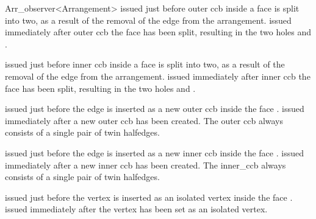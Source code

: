 \begin{ccRefClass}{Arr_observer<Arrangement>}
    {issued just before outer ccb  inside a face  is split into
     two, as a result of the removal of the edge  from the arrangement.}
\ccGlue
{}
    {issued immediately after outer ccb the face  has been split,
     resulting in the two holes  and .}

    {issued just before inner ccb  inside a face  is split into
     two, as a result of the removal of the edge  from the arrangement.}
\ccGlue
{}
    {issued immediately after inner ccb the face  has been split,
     resulting in the two holes  and .}

    {issued just before the edge  is inserted as a new outer ccb inside
     the face .}
\ccGlue
{}
    {issued immediately after a new outer ccb  has been created. The
     outer ccb always consists of a single pair of twin halfedges.}

    {issued just before the edge  is inserted as a new inner ccb inside
     the face .}
\ccGlue
{}
    {issued immediately after a new inner ccb  has been created. The
     inner_ccb always consists of a single pair of twin halfedges.}

    {issued just before the vertex  is inserted as an isolated
     vertex inside the face .}
\ccGlue
{}
    {issued immediately after the vertex  has been set as an
     isolated vertex.}


\end{ccRefClass}
